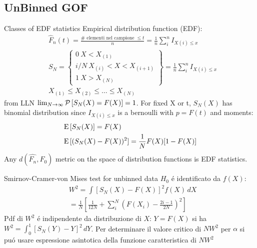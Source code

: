 \documentclass[asd-beamer.tex]{subfiles}
\begin{document}
\subsection{UnBinned GOF}\label{unbinnedgof}

\begin{frame}{Classes of EDF statistics}
	Empirical distribution function (EDF): 
	\begin{align*}
	&\hat{F}_n(t)=\frac{\#\text{ elementi nel campione }\leq t}{n}=\frac{1}{n}\sum_i^nI_{X(i)\leq x}\\
	&S_N=\left\{\begin{array}{c}0\ X<X_{(1)}\\i/N\ X_{(i)}<X<X_{(i+1)}\\1\ X>X_{(N)}\end{array}\right\}=\frac{1}{n}\sum_i^nI_{X(i)\leq x}\\
	&X_{(1)}\leq X_{(2)}\leq\ldots\leq X_{(N)}
	\end{align*}
from LLN $\lim_{N\to\infty}\operatorname{\mathcal{P}}{[S_N(X)=F(X)]}=1$. For fixed X or t, $S_N(X)$ has binomial distribution since $I_{X(i)\leq x}$ is a bernoulli with $p=F(t)$ and moments:
\begin{align*}
&\operatorname{E}{[S_N(X)]}=F(X)\\
&\operatorname{E}{[(S_N(X)-F(X))^2]}=\frac{1}{N}F(X)[1-F(X)]
\end{align*}
Any $d(\hat{F_n},F_0)$ metric on the space of distribution functions is EDF statistics.
\end{frame}

\begin{frame}{Smirnov-Cramer-von Mises test for unbinned data}
$H_0$ \'e identificato da $f(X)$:
\begin{align*}
&W^2=\int[S_N(X)-F(X)]^2f(X)\,dX\\
&=\frac{1}{N}[\frac{1}{12N}+\sum_i^N(F(X_i)-\frac{2i-1}{2N})^2]
\end{align*}
Pdf di $W^2$ \'e indipendente da distribuzione di $X$: $Y=F(X)$ si ha
$W^2=\int_0^1[S_N(Y)-Y]^2\,dY$.
Per determinare il valore critico di $NW^2$ per $\alpha$ si pu\'o usare espressione asintotica della funzione caratteristica di $NW^2$
\end{frame}
\end{document}
